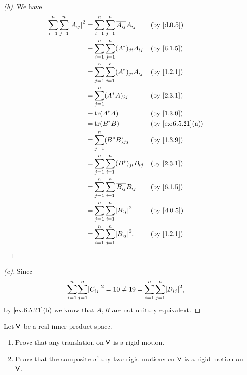 \begin{proof}[(b)]
  We have
  \begin{align*}
    \sum_{i = 1}^n \sum_{j = 1}^n \abs{A_{i j}}^2 & = \sum_{i = 1}^n \sum_{j = 1}^n \conj{A_{i j}} A_{i j} &  & \by{d.0.5}        \\
                                                  & = \sum_{i = 1}^n \sum_{j = 1}^n (A^*)_{j i} A_{i j}    &  & \by{6.1.5}        \\
                                                  & = \sum_{j = 1}^n \sum_{i = 1}^n (A^*)_{j i} A_{i j}    &  & \by{1.2.1}        \\
                                                  & = \sum_{j = 1}^n (A^* A)_{j j}                         &  & \by{2.3.1}        \\
                                                  & = \tr[A^* A]                                           &  & \by{1.3.9}        \\
                                                  & = \tr[B^* B]                                           &  & \by{ex:6.5.21}[a] \\
                                                  & = \sum_{j = 1}^n (B^* B)_{j j}                         &  & \by{1.3.9}        \\
                                                  & = \sum_{j = 1}^n \sum_{i = 1}^n (B^*)_{j i} B_{i j}    &  & \by{2.3.1}        \\
                                                  & = \sum_{j = 1}^n \sum_{i = 1}^n \conj{B_{i j}} B_{i j} &  & \by{6.1.5}        \\
                                                  & = \sum_{j = 1}^n \sum_{i = 1}^n \abs{B_{i j}}^2        &  & \by{d.0.5}        \\
                                                  & = \sum_{i = 1}^n \sum_{j = 1}^n \abs{B_{i j}}^2.       &  & \by{1.2.1}
  \end{align*}
\end{proof}

\begin{proof}[(c)]
  Since
  \[
    \sum_{i = 1}^n \sum_{j = 1}^n \abs{C_{i j}}^2 = 10 \neq 19 = \sum_{i = 1}^n \sum_{j = 1}^n \abs{D_{i j}}^2,
  \]
  by \cref{ex:6.5.21}(b) we know that \(A, B\) are not unitary equivalent.
\end{proof}

\begin{ex}\label{ex:6.5.22}
  Let \(\mathsf{V}\) be a real inner product space.
  \begin{enumerate}
    \item Prove that any translation on \(\mathsf{V}\) is a rigid motion.
    \item Prove that the composite of any two rigid motions on \(\mathsf{V}\) is a rigid motion on \(\mathsf{V}\).
  \end{enumerate}
\end{ex}

